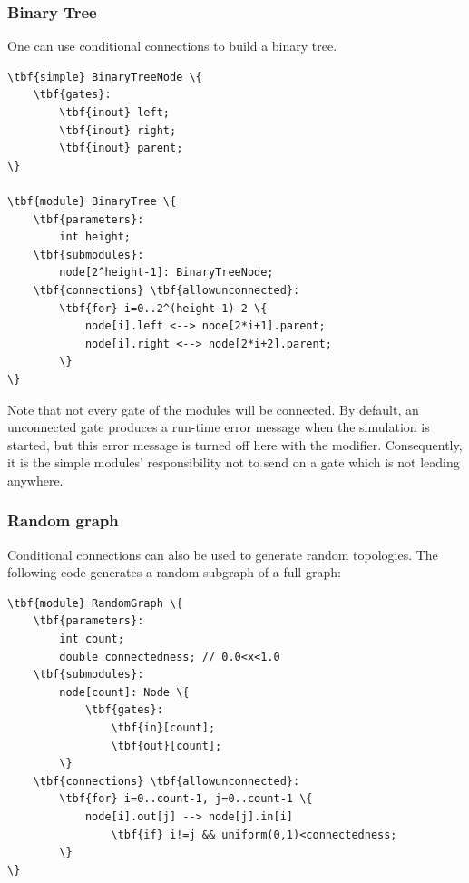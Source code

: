 \subsubsection{Binary Tree}

One can use conditional connections to build a binary tree.

\begin{Verbatim}[commandchars=\\\{\}]
\tbf{simple} BinaryTreeNode \{
    \tbf{gates}:
        \tbf{inout} left;
        \tbf{inout} right;
        \tbf{inout} parent;
\}

\tbf{module} BinaryTree \{
    \tbf{parameters}:
        int height;
    \tbf{submodules}:
        node[2^height-1]: BinaryTreeNode;
    \tbf{connections} \tbf{allowunconnected}:
        \tbf{for} i=0..2^(height-1)-2 \{
            node[i].left <--> node[2*i+1].parent;
            node[i].right <--> node[2*i+2].parent;
        \}
\}
\end{Verbatim}

Note that not every gate of the modules will be connected. By default,
an unconnected gate produces a run-time error message when the
simulation is started, but this error message is turned off here with
the  modifier.
Consequently, it is the simple modules' responsibility not to send
on a gate which is not leading anywhere.



\subsubsection{Random graph}

Conditional connections can also be used to generate random
topologies.  The following code generates a
random subgraph of a full graph:

\begin{Verbatim}[commandchars=\\\{\}]
\tbf{module} RandomGraph \{
    \tbf{parameters}:
        int count;
        double connectedness; // 0.0<x<1.0
    \tbf{submodules}:
        node[count]: Node \{
            \tbf{gates}:
                \tbf{in}[count];
                \tbf{out}[count];
        \}
    \tbf{connections} \tbf{allowunconnected}:
        \tbf{for} i=0..count-1, j=0..count-1 \{
            node[i].out[j] --> node[j].in[i]
                \tbf{if} i!=j && uniform(0,1)<connectedness;
        \}
\}
\end{Verbatim}


